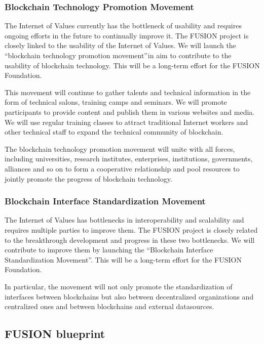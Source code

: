 \documentclass[a4paper,12pt]{article}
\begin{document}
\subsubsection{Blockchain Technology Promotion Movement}

The Internet of Values currently has the bottleneck of usability and requires ongoing efforts in the future to continually improve it. The FUSION project is closely linked to the usability of the Internet of Values. We will launch the “blockchain technology promotion movement” in aim to contribute to the usability of blockchain technology. This will be a long-term effort for the FUSION Foundation.

This movement will continue to gather talents and technical information in the form of technical salons, training camps and seminars. We will promote participants to provide content and publish them in various websites and media. We will use regular training classes to attract traditional Internet workers and other technical staff to expand the technical community of blockchain.

The blockchain technology promotion movement will unite with all forces, including universities, research institutes, enterprises, institutions, governments, alliances and so on to form a cooperative relationship and pool resources to jointly promote the progress of blockchain technology.

\subsubsection{Blockchain Interface Standardization Movement}

The Internet of Values has bottlenecks in interoperability and scalability and requires multiple parties to improve them. The FUSION project is closely related to the breakthrough development and progress in these two bottlenecks. We will contribute to improve them by launching the “Blockchain Interface Standardization Movement”. This will be a long-term effort for the FUSION Foundation.

In particular, the movement will not only promote the standardization of interfaces between blockchains but also between decentralized organizations and centralized ones and between blockchains and external datasources.

\subsection{FUSION blueprint}
\end{document}
